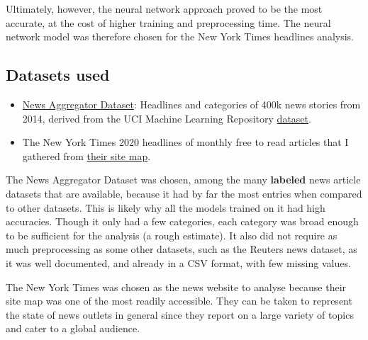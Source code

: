 \documentclass[11pt]{article}
\begin{document}
Ultimately, however, the neural network approach proved to be the most
accurate, at the cost of higher training and preprocessing time. The neural
network model was therefore chosen for the New York Times headlines analysis.

\subsection*{Datasets used}

\begin{itemize}
\item
\href{https://www.kaggle.com/uciml/news-aggregator-dataset}
{News Aggregator Dataset}:
Headlines and categories of 400k news stories from 2014,
derived from the UCI Machine Learning Repository
\href{http://archive.ics.uci.edu/ml/datasets/News+Aggregator}{dataset}.
\item
The New York Times 2020 headlines of monthly free to read articles that I
gathered from
\href{https://spiderbites.nytimes.com/2020/}
{their site map}.
\end{itemize}

The News Aggregator Dataset was chosen, among the many \textbf{labeled} news
article datasets that are available, because it had by far the most entries
when compared to other datasets. This is likely why all the models trained on
it had high accuracies. Though it only had a few categories, each category
was broad enough to be sufficient for the analysis (a rough estimate). It
also did not require as much preprocessing as some other datasets, such as
the Reuters news dataset, as it was well documented, and already in a CSV
format, with few missing values.

The New York Times was chosen as the news website to analyse because their
site map was one of the most readily accessible. They can be taken
to represent the state of news outlets in general since they report on a
large variety of topics and cater to a global audience.
\end{document}
